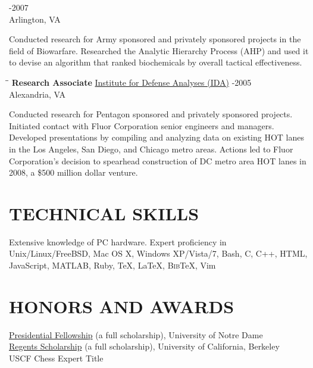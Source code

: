 \documentclass{resume}
\begin{document}
\begin{resume}
\begin{tabbing}
		-2007 \\
		\>Arlington, VA
	\end{tabbing}\vspace{-15pt}    
	Conducted research for Army sponsored and privately sponsored projects 
	in the field of Biowarfare. Researched the Analytic Hierarchy Process 
	(AHP) and used it to devise an algorithm that ranked biochemicals by 
	overall tactical effectiveness.
	\begin{tabbing}
		\hspace{2.3in}\= \hspace{2.6in}\= \kill
        {\bf Research Associate } \>\href{https://www.ida.org/}{Institute for
        Defense Analyses (IDA)} -2005\\
		\>Alexandria, VA
	\end{tabbing}\vspace{-15pt}
	Conducted research for Pentagon sponsored and privately sponsored 
	projects. Initiated contact with Fluor Corporation senior engineers and 
	managers. Developed presentations by compiling and analyzing data on 
	existing HOT lanes in the Los Angeles, San Diego, and Chicago metro 
	areas.  Actions led to Fluor Corporation's decision to spearhead 
	construction of DC metro area HOT lanes in 2008, a \$500 million dollar 
	venture.

	\section{TECHNICAL SKILLS} \vspace{0.05in}
	Extensive knowledge of PC hardware. Expert proficiency in 
Unix/Linux/FreeBSD, Mac OS X, Windows XP/Vista/7, Bash, C, C++, HTML, 
JavaScript, MATLAB, Ruby, \TeX{}, \LaTeX{}, B\textsc{ib}\TeX{}, Vim 

	\section{HONORS AND AWARDS} \vspace{0.05in}
    \href{http://graduateschool.nd.edu/admissions/financial-support/prestigious-fellowships/presidential-fellowships-arthur-j-schmitt-fellowships/}{Presidential
    Fellowship} (a full scholarship), University of Notre Dame \\
    \href{http://students.berkeley.edu/finaid/undergraduates/types_regents.htm}{Regents
    Scholarship} (a full scholarship), University of California, 
	Berkeley \\
	USCF Chess Expert Title


\end{resume}
\end{document}

